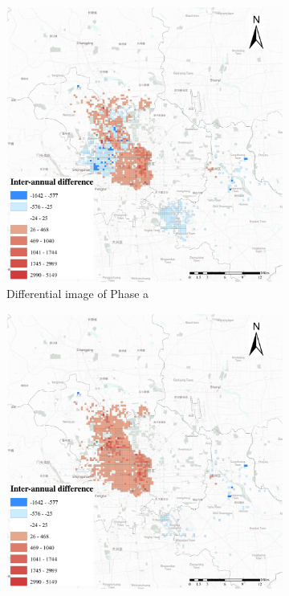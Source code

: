 \documentclass[preprints,ijgi,submit,moreauthors]{Definitions/mdpi}
\begin{document}
\begin{figure}[H]
    \vspace{6pt}
    \begin{subfigure}{.3\textwidth}
        \includegraphics[width=\textwidth]{Figures/BSSMinusmp1.eps}
        \caption{Differential image of Phase a}
    \end{subfigure}
        \begin{subfigure}{.3\textwidth}
        \includegraphics[width=\textwidth]{Figures/BSSMinusmp2.eps}

\end{subfigure}
\end{figure}
\end{document}

